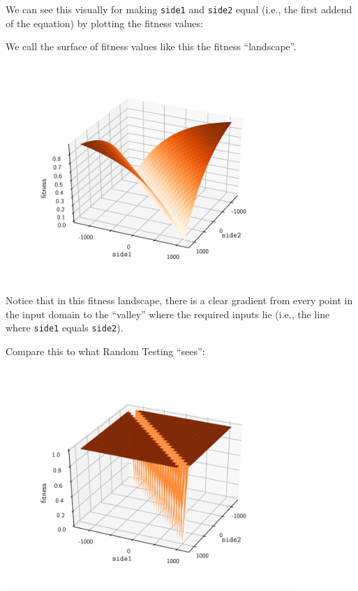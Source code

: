 We can see this visually for making {\tt side1} and {\tt side2} equal (i.e., the
first addend of the equation) by plotting the fitness values:

We call the surface of fitness values like this the fitness ``landscape''. 


\begin{center}
    \vspace{-1em}
    \includegraphics[width=11cm]{plots/sbst-side1-equals-side2.pdf}
    \vspace{-1em}
\end{center}

Notice that in this fitness landscape, there is a clear gradient from every
point in the input domain to the ``valley'' where the required inputs lie (i.e.,
the line where {\tt side1} equals {\tt side2}). 

Compare this to what Random Testing ``sees'': 


\begin{center}
    \vspace{-1em}
    \includegraphics[width=11cm]{plots/rt-side1-equals-side2.pdf}
    \vspace{-1em}
\end{center}

